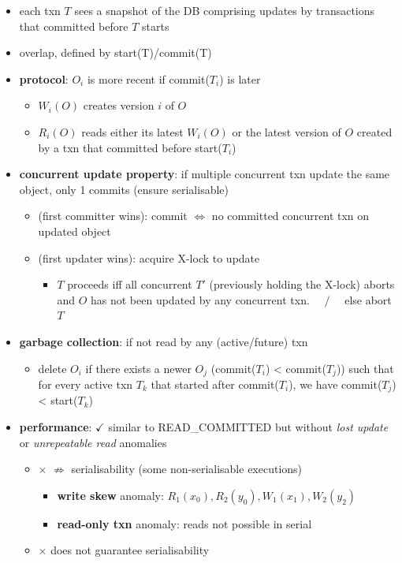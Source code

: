 \documentclass[10pt, landscape]{article}
\begin{document}
\begin{multicols*}{4}
  \begin{itemize}
    \item each txn $T$ sees a snapshot of the DB comprising updates by transactions that committed before $T$ starts
    \item {} overlap, defined by start(T)/commit(T)
    \item \textbf{protocol}: $O_i$ is more recent if commit($T_i$) is later
      \begin{itemize}
        \item $W_i(O)$ creates version $i$ of $O$ 
        \item $R_i(O)$ reads either its latest $W_i(O)$ or the latest version of $O$ created by a txn that committed before start($T_i$)
      \end{itemize}
    \item \textbf{concurrent update property}: if multiple concurrent txn update the same object, only 1 commits (ensure serialisable)
      \begin{itemize}
        \item {} (first committer wins): commit $\iff$ no committed concurrent txn on updated object
        \item {} (first updater wins): acquire X-lock to update
          \begin{itemize}
            \item $T$ proceeds iff all concurrent $T'$ (previously holding the X-lock) aborts and $O$ has not been updated by any concurrent txn. $\quad/\quad$ else abort $T$
          \end{itemize}
      \end{itemize}
    \item \textbf{garbage collection}: if not read by any (active/future) txn
      \begin{itemize}
        \item delete $O_i$ if there exists a newer $O_j$ (commit($T_i$) < commit($T_j$)) such that for every active txn $T_k$ that started after commit($T_i$),  we have commit($T_j$) < start($T_k$)
      \end{itemize}
    \item \textbf{performance}: $\checkmark$ similar to READ\_COMMITTED but without \textit{lost update} or \textit{unrepeatable read} anomalies
      \begin{itemize}
        \item $\times$ $\not\Rightarrow$ serialisability (some non-serialisable executions)
          \begin{itemize}
            \item \textbf{write skew} anomaly: $\scriptscriptstyle R_1(x_0), R_2(y_0), W_1(x_1), W_2(y_2)$
            \item \textbf{read-only txn} anomaly: reads not possible in serial
          \end{itemize}
        \item $\times$ does not guarantee serialisability
      \end{itemize}
  \end{itemize}


\end{multicols*}
\end{document}
